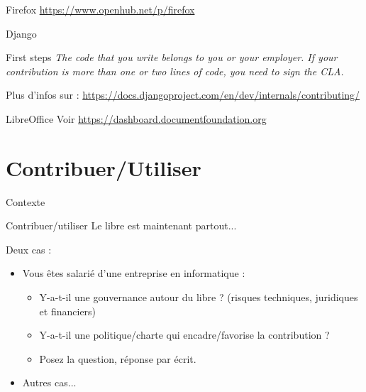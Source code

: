 \documentclass{beamer}
\begin{document}
\begin{frame}{Firefox}
  \url{https://www.openhub.net/p/firefox}
\end{frame}

\begin{frame}{Django}

  \begin{block}{First steps}
    \textit{The code that you write belongs to you or your
      employer. If your contribution is more than one or two lines of
      code, you need to sign the CLA.}
  \end{block}

  Plus d'infos sur :
  \url{https://docs.djangoproject.com/en/dev/internals/contributing/}
\end{frame}


\begin{frame}{LibreOffice}
  Voir \url{https://dashboard.documentfoundation.org}
\end{frame}

\section{Contribuer/Utiliser}

\begin{frame}{Contexte}

  \begin{block}{Contribuer/utiliser}
    Le libre est maintenant partout...
  \end{block}
  Deux cas :
  \begin{itemize}
  \item Vous êtes salarié d'une entreprise en informatique :
    \begin{itemize}
    \item Y-a-t-il une gouvernance autour du libre ? (risques
      techniques, juridiques et financiers)
    \item Y-a-t-il une politique/charte qui encadre/favorise la
      contribution ?
    \item Posez la question, réponse par écrit.
    \end{itemize}
  \item Autres cas...
  \end{itemize}
  
\end{frame}

\end{document}

